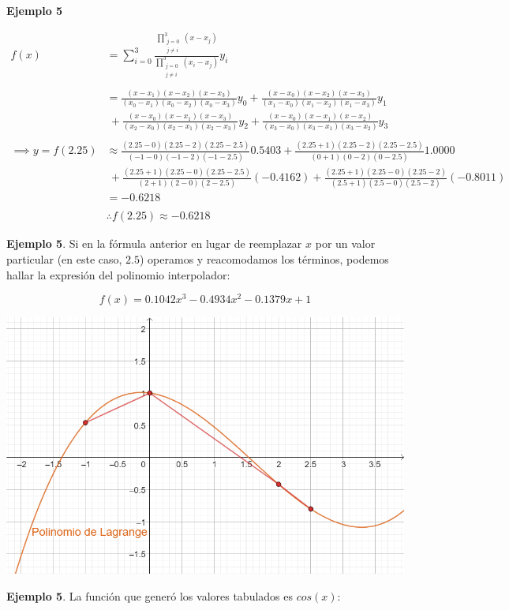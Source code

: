 \documentclass[openany]{book}
\begin{document}
\textbf{Ejemplo 5}

\[
\begin{split}
f(x) &= \sum_{i = 0}^3 \frac{\prod\limits_{\substack{j = 0\\ j \neq i}}^3 (x - x_j)}{\prod\limits_{\substack{j = 0\\ j \neq i}}^3 (x_i - x_j)} y_i \\ \\
&= \frac{(x - x_1)(x - x_2)(x - x_3)}{(x_0 - x_1)(x_0 - x_2)(x_0 - x_3)} y_0 + \frac{(x - x_0)(x - x_2)(x - x_3)}{(x_1 - x_0)(x_1 - x_2)(x_1 - x_3)} y_1 \\
&~ + \frac{(x - x_0)(x - x_1)(x - x_3)}{(x_2 - x_0)(x_2 - x_1)(x_2 - x_3)} y_2 + \frac{(x - x_0)(x - x_1)(x - x_2)}{(x_3 - x_0)(x_3 - x_1)(x_3 - x_2)} y_3 \\ \\
\implies y = f(2.25) &\approx \frac{(2.25 - 0)(2.25 - 2)(2.25 - 2.5)}{(-1-0)(-1-2)(-1-2.5)} 0.5403 + \frac{(2.25 +1)(2.25 - 2)(2.25 - 2.5)}{(0+1)(0-2)(0-2.5)} 1.0000 \\
&~ + \frac{(2.25 +1)(2.25 - 0)(2.25 - 2.5)}{(2+1)(2-0)(2-2.5)} (-0.4162) + \frac{(2.25 +1)(2.25 - 0)(2.25 - 2)}{(2.5+1)(2.5-0)(2.5-2)} (-0.8011) \\
&= -0.6218 \\ \\
&\therefore f(2.25) \approx -0.6218
\end{split}
\]

\textbf{Ejemplo 5}. Si en la fórmula anterior en lugar de reemplazar \(x\) por un valor particular (en este caso, \(2.5\)) operamos y reacomodamos los términos, podemos hallar la expresión del polinomio interpolador:

\[
f(x) = 0.1042 x^3 -0.4934 x^2 -0.1379 x+1
\]

\begin{center}\includegraphics[width=0.6\linewidth]{Plots/U4/lagrej2} \end{center}

\textbf{Ejemplo 5}. La función que generó los valores tabulados es \(cos(x)\):
\end{document}
